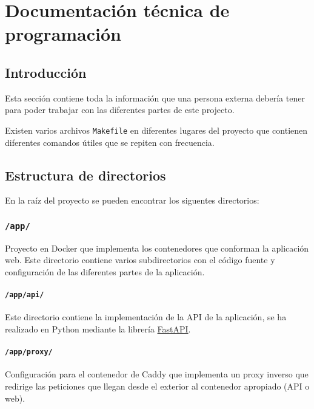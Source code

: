 \chapter{Documentación técnica de programación}
\label{cha:Documentación técnica de programación}

\section{Introducción}

Esta sección contiene toda la información que una persona externa debería tener
para poder trabajar con las diferentes partes de este projecto.

Existen varios archivos \texttt{Makefile} en diferentes lugares del proyecto que
contienen diferentes comandos útiles que se repiten con frecuencia.

\section{Estructura de directorios}

En la raíz del proyecto se pueden encontrar los siguentes directorios:

\subsection{\texttt{/app/}}

Proyecto en Docker que implementa los contenedores que conforman la aplicación
web. Este directorio contiene varios subdirectorios con el código fuente y
configuración de las diferentes partes de la aplicación.

\subsubsection{\texttt{/app/api/}}

Este directorio contiene la implementación de la API de la aplicación, se ha
realizado en Python mediante la librería
\href{https://fastapi.tiangolo.com/}{FastAPI}.

\subsubsection{\texttt{/app/proxy/}}

Configuración para el contenedor de Caddy que implementa un proxy inverso que
redirige las peticiones que llegan desde el exterior al contenedor apropiado
(API o web).

